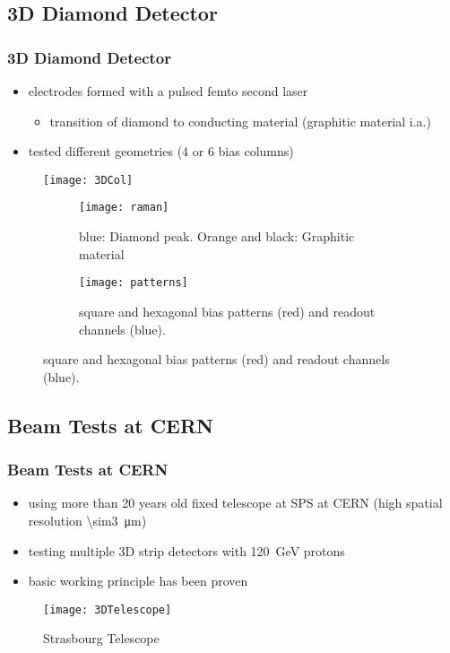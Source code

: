 \subsection{3D Diamond Detector}
\begin{frame}
	\frametitle{3D Diamond Detector}
	\begin{minipage}{9cm}
		\begin{itemize}
			\item electrodes formed with a pulsed femto second laser %
			\begin{itemize}
				\item transition of diamond to conducting material (graphitic material i.a.)
			\end{itemize}
			\item tested different geometries (4 or 6 bias columns)
		\end{itemize}
	\end{minipage}
	\begin{minipage}{3cm}
		\begin{figure}
			\centering
			\texttt{[image: 3DCol]}
		\end{figure}
	\end{minipage}
	\begin{figure}
		\centering
		\begin{subfigure}[t]{0.45\textwidth}
			\centering
			\texttt{[image: raman]}
			\caption{blue: Diamond peak. Orange and black: Graphitic material}
		\end{subfigure}
		\begin{subfigure}[t]{0.45\textwidth}
			\centering
			\texttt{[image: patterns]}
			\caption{square and hexagonal bias patterns (red) and readout channels (blue).}
		\end{subfigure}
	\end{figure}
\end{frame}

\subsection{Beam Tests at CERN}
\begin{frame}
	\frametitle{Beam Tests at CERN}
	\begin{itemize}
		\setlength{\itemsep}{\fill}
		\item using more than 20 years old fixed telescope at SPS at CERN (high spatial resolution \SI{\sim3}{\micro\meter})
		\item testing multiple 3D strip detectors with \SI{120}{GeV} protons
		\item basic working principle has been proven
	\end{itemize}
	\begin{figure}
		\centering
		\texttt{[image: 3DTelescope]}
		\caption{Strasbourg Telescope}
	\end{figure}
\end{frame}
